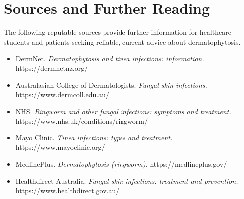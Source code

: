 \section*{Sources and Further Reading}
The following reputable sources provide further information for healthcare students and patients seeking reliable, current advice about dermatophytosis.

\begin{itemize}
    \item DermNet. \textit{Dermatophytosis and tinea infections: information.} https://dermnetnz.org/
    \item Australasian College of Dermatologists. \textit{Fungal skin infections.} https://www.dermcoll.edu.au/
    \item NHS. \textit{Ringworm and other fungal infections: symptoms and treatment.} https://www.nhs.uk/conditions/ringworm/
    \item Mayo Clinic. \textit{Tinea infections: types and treatment.} https://www.mayoclinic.org/
    \item MedlinePlus. \textit{Dermatophytosis (ringworm).} https://medlineplus.gov/
    \item Healthdirect Australia. \textit{Fungal skin infections: treatment and prevention.} https://www.healthdirect.gov.au/
\end{itemize}
